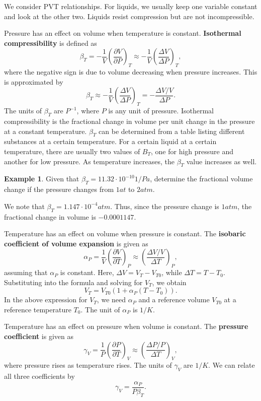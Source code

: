 \documentclass[11pt]{article}
\theoremstyle{plain} %
\theoremstyle{definition}
\theoremstyle{example}
\newtheorem*{example}{Example}
\theoremstyle{remark}
\begin{document}
We consider PVT relationships. For liquids, we usually keep one variable constant and look at the other two. Liquids resist compression but are not incompressible. 

Pressure has an effect on volume when temperature is constant. \textbf{Isothermal compressibility} is defined as 
$$\beta_T = -\frac{1}{V}\left(\frac{\partial V}{\partial P}\right)_T \approx -\frac{1}{V}\left(\frac{\Delta V}{\Delta P}\right)_T,$$
where the negative sign is due to volume decreasing when pressure increases. This is approximated by 
$$\beta_T \approx -\frac{1}{V}\left(\frac{\Delta V}{\Delta P}\right)_T = -\frac{\Delta V/V}{\Delta P}.$$
The units of $\beta_T$ are $P^{-1}$, where $P$ is any unit of pressure. Isothermal compressibility is the fractional change in volume per unit change in the pressure at a constant temperature. $\beta_T$ can be determined from a table listing different substances at a certain temperature. For a certain liquid at a certain temperature, there are usually two values of $B_T$, one for high pressure and another for low pressure. As temperature increases, the $\beta_T$ value increases as well. 

\begin{example}
Given that $\beta_T = 11.32\cdot 10^{-10}1/Pa$, determine the fractional volume change if the pressure changes from $1at$ to $2atm$. 
\end{example} 

We note that $\beta_T = 1.147\cdot 10^{-4}atm$. Thus, since the pressure change is $1atm$, the fractional change in volume is $-0.0001147$. 

Temperature has an effect on volume when pressure is constant. The \textbf{isobaric coefficient of volume expansion} is given as 
$$\alpha_P = \frac{1}{V} \left(\frac{\partial V}{\partial T}\right)_P \approx  \left(\frac{\Delta V/V}{\Delta T}\right)_P,$$
assuming that $\alpha_P$ is constant. Here, $\Delta V = V_T-V_{T0}$, while $\Delta T = T-T_0$. Substituting into the formula and solving for $V_T$, we obtain 
$$V_T = V_{T0}(1+\alpha_P(T-T_0)).$$
In the above expression for $V_T$, we need $\alpha_P$ and a reference volume $V_{T0}$ at a reference temperature $T_0$. The unit of $\alpha_P$ is $1/K$. 

Temperature has an effect on pressure when volume is constant. The \textbf{pressure coefficient} is given as 
$$\gamma_V = \frac{1}{P}\left(\frac{\partial P}{\partial T}\right)_V \approx \left(\frac{\Delta P/P}{\Delta T}\right)_V,$$where pressure rises as temperature rises. The units of $\gamma_V$ are $1/K$. We can relate all three coefficients by 
$$\gamma_V = \frac{\alpha_P}{P\beta_T}.$$
\end{document}
